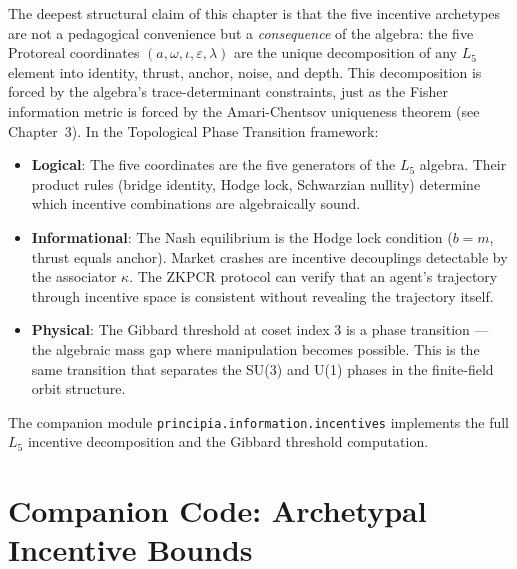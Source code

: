The deepest structural claim of this chapter is that the five incentive archetypes are not a pedagogical convenience but a \emph{consequence} of the algebra: the five Protoreal coordinates $(a, \omega, \iota, \varepsilon, \lambda)$ are the unique decomposition of any $L_5$ element into identity, thrust, anchor, noise, and depth. This decomposition is forced by the algebra's trace-determinant constraints, just as the Fisher information metric is forced by the Amari-Chentsov uniqueness theorem (see Chapter~3). In the Topological Phase Transition framework:

\begin{itemize}[noitemsep]
    \item \textbf{Logical}: The five coordinates are the five generators of the $L_5$ algebra. Their product rules (bridge identity, Hodge lock, Schwarzian nullity) determine which incentive combinations are algebraically sound.
    \item \textbf{Informational}: The Nash equilibrium is the Hodge lock condition ($b = m$, thrust equals anchor). Market crashes are incentive decouplings detectable by the associator $\kappa$. The ZKPCR protocol can verify that an agent's trajectory through incentive space is consistent without revealing the trajectory itself.
    \item \textbf{Physical}: The Gibbard threshold at coset index 3 is a phase transition --- the algebraic mass gap where manipulation becomes possible. This is the same transition that separates the SU(3) and U(1) phases in the finite-field orbit structure.
\end{itemize}

The companion module \texttt{principia.information.incentives} implements the full $L_5$ incentive decomposition and the Gibbard threshold computation.

\section*{Companion Code: Archetypal Incentive Bounds}

